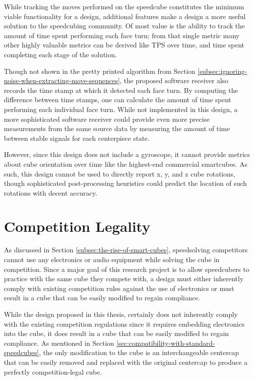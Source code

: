 While tracking the moves performed on the speedcube constitutes the
minimum viable functionality for a design, additional features make a
design a more useful solution to the speedcubing community. Of most
value is the ability to track the amount of time spent performing each
face turn; from that single metric many other highly valuable metrics
can be derived like TPS over time, and time spent completing each stage
of the solution.

Though not shown in the pretty printed algorithm from Section
\ref{subsec:ignoring-noise-when-extracting-move-sequences}, the
proposed software receiver also records the time stamp at which it
detected each face turn. By computing the difference between time
stamps, one can calculate the amount of time spent performing each
individual face turn. While not implemented in this design, a more
sophisticated software receiver could provide even more precise
measurements from the same source data by measuring the amount of time
between stable signals for each centerpiece state.

However, since this design does not include a gyroscope, it cannot
provide metrics about cube orientation over time like the highest-end
commercial smartcubes. As such, this design cannot be used to directly
report x, y, and z cube rotations, though sophisticated post-processing
heuristics could predict the location of such rotations with decent
accuracy.


\section{Competition Legality}
\label{sec:competition-legality}

As discussed in Section \ref{subsec:the-rise-of-smart-cubes},
speedsolving competitors cannot use any electronics or audio equipment
while solving the cube in competition. Since a major goal of this
research project is to allow speedcubers to practice with the same cube
they compete with, a design must either inherently comply with existing
competition rules against the use of electronics or must result in a
cube that can be easily modified to regain compliance.

While the design proposed in this thesis, certainly does not inherently
comply with the existing competition regulations since it requires
embedding electronics into the cube, it does result in a cube that can
be easily modified to regain compliance. As mentioned in Section
\ref{sec:compatibility-with-standard-speedcubes}, the only modification
to the cube is an interchangeable centercap that can be easily removed
and replaced with the original centercap to produce a perfectly
competition-legal cube.

